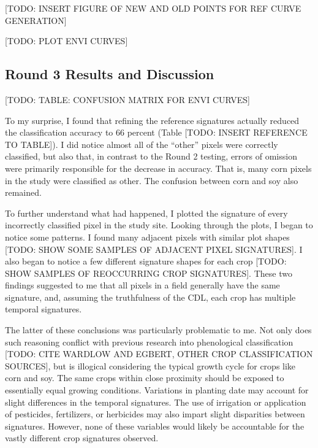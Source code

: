 [TODO: INSERT FIGURE OF NEW AND OLD POINTS FOR REF CURVE GENERATION]

[TODO: PLOT ENVI CURVES]

\subsection*{Round 3 Results and Discussion}

[TODO: TABLE: CONFUSION MATRIX FOR ENVI CURVES]


To my surprise, I found that refining the reference signatures actually reduced the classification accuracy to 66 percent (Table [TODO: INSERT REFERENCE TO TABLE]). I did notice almost all of the “other” pixels were correctly classified, but also that, in contrast to the Round 2 testing, errors of omission were primarily responsible for the decrease in accuracy. That is, many corn pixels in the study were classified as other. The confusion between corn and soy also remained.

To further understand what had happened, I plotted the signature of every incorrectly classified pixel in the study site. Looking through the plots, I began to notice some patterns. I found many adjacent pixels with similar plot shapes [TODO: SHOW SOME SAMPLES OF ADJACENT PIXEL SIGNATURES]. I also began to notice a few different signature shapes for each crop [TODO: SHOW SAMPLES OF REOCCURRING CROP SIGNATURES]. These two findings suggested to me that all pixels in a field generally have the same signature, and, assuming the truthfulness of the CDL, each crop has multiple temporal signatures.

The latter of these conclusions was particularly problematic to me. Not only does such reasoning conflict with previous research into phenological classification [TODO: CITE WARDLOW AND EGBERT, OTHER CROP CLASSIFICATION SOURCES], but is illogical considering the typical growth cycle for crops like corn and soy. The same crops within close proximity should be exposed to essentially equal growing conditions. Variations in planting date may account for slight differences in the temporal signatures. The use of irrigation or application of pesticides, fertilizers, or herbicides may also impart slight disparities between signatures. However, none of these variables would likely be accountable for the vastly different crop signatures observed.

